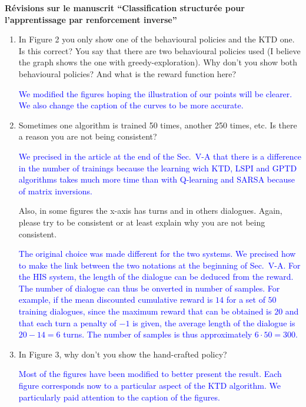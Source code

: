 \documentclass[11pt, a4paper]{letter}
\begin{document}
\begin{letter}{\large \textbf{Révisions sur le manuscrit ``Classification structurée pour l'apprentissage par renforcement inverse''}}
\begin{enumerate}
\textcolor{blue}{Our aim was to show that one algorithm (KTD) can
perform as well as standard other ones (and sometime better) while
being generic. We added the LSPI comparison for both systems (Fig.~1
and Fig.~2). Thank you very much for he reference. We added it to
the bibliography. }


\item In Figure 2 you only show one of the behavioural policies and the KTD one.
 Is this correct? You say that there are two behavioural policies used (I
 believe the graph shows the one with greedy-exploration). Why don't you
 show both behavioural policies? And what is the reward function here?

\textcolor{blue}{We modified the figures hoping the illustration of
our points will be clearer. We also change the caption of the curves
to be more accurate.}

\item Sometimes one algorithm is trained 50 times, another 250 times, etc. Is
 there a reason you are not being consistent?

\textcolor{blue}{We precised in the article at the end of the
Sec.~V-A that there is a difference in the number of trainings
because the learning wich KTD, LSPI and GPTD algorithms takes much
more time than with Q-learning and SARSA because of matrix
inversions.}

 Also, in some figures the
 x-axis has turns and in others dialogues. Again, please try to be
 consistent or at least explain why you are not being consistent.

\textcolor{blue}{The original choice was made different for the two
systems. We precised how to make the link between the two notations
at the beginning of Sec.~V-A. For the HIS system, the length of the
dialogue can be deduced from the reward. The number of dialogue can
thus be onverted in number of samples. For example, if the mean
discounted cumulative reward is $14$ for a set of $50$ training
dialogues, since the maximum reward that can be obtained is $20$ and
that each turn a penalty of $-1$ is given, the average length of the
dialogue is $20 - 14 = 6$ turns. The number of samples is thus
approximately $6 \cdot 50 = 300$.}

\item  In Figure 3, why don't you show the hand-crafted policy?

\textcolor{blue}{Most of the figures have been modified to better
present the result. Each figure corresponds now to a particular
aspect of the KTD algorithm. We particularly paid attention to the
caption of the figures.}


\end{enumerate}
\end{letter}
\end{document}
